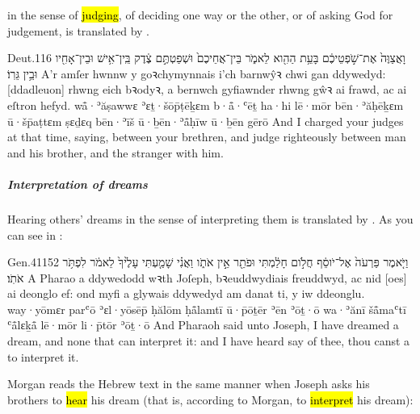 
\begin{paper}
	{\click}  in the sense of \hl{judging}, of deciding one way or the other, or of asking God for judgement, is translated by .
\end{paper}

\begin{example}{Deut.}{1}{16}{}{}
	\quoling
	{וָאֲצַוֶּה֙ אֶת־שֹׁ֣פְטֵיכֶ֔ם בָּעֵ֥ת הַהִ֖וא לֵאמֹ֑ר  בֵּין־אֲחֵיכֶם֙ וּשְׁפַטְתֶּ֣ם צֶ֔דֶק בֵּֽין־אִ֥ישׁ וּבֵין־אָחִ֖יו וּבֵ֥ין גֵּרֽוֹ׃}
	{A’r amſer hwnnw y goꝛchymynnais i’ch barnwŷꝛ chwi gan ddywedyd:  [ddadleuon] rhwng eich bꝛodyꝛ, a bernwch gyfiawnder rhwng gŵꝛ ai frawd, ac ai eſtron hefyd.}
	{wå̄·ʾăṣawwɛ ʾɛṯ·šōp̄ṭēḵɛm b·å̄·ʿēṯ ha·hi lē·mōr  bēn·ʾăḥēḵɛm ū·šp̄aṭtɛm ṣɛḏɛq bēn·ʾīš ū·ḇēn·ʾå̄ḥīw ū·ḇēn gērō}
	{And I charged your judges at that time, saying,   between your brethren, and judge righteously between  man and his brother, and the stranger  with him.}
\end{example}



\subparagraph{Interpretation of dreams}

\begin{paper}
	{\click} Hearing others’ dreams in the sense of interpreting them is translated by . As you can see in :
\end{paper}

\begin{example}{Gen.}{41}{15}{2}{}
	\quoling
	{וַיֹּ֤אמֶר פַּרְעֹה֙ אֶל־יֹוסֵ֔ף חֲלֹ֣ום חָלַ֔מְתִּי וּפֹתֵ֖ר אֵ֣ין אֹתֹ֑ו וַאֲנִ֗י שָׁמַ֤עְתִּי עָלֶ֙יךָ֙ לֵאמֹ֔ר   לִפְתֹּ֥ר אֹתֹֽו׃}
	{A Pharao a ddywedodd wꝛth Joſeph, bꝛeuddwydiais freuddwyd, ac nid [oes] ai deonglo ef: ond myfi a glywais ddywedyd am danat ti, y   iw ddeonglu.}
	{way·yōmɛr parʿō ʾɛl·yōsēp̄ ḥălōm ḥå̄lamtī ū·p̄ōṯēr ʾēn ʾōṯ·ō wa·ʾănī šå̄maʿtī ʿå̄lɛḵå̄ lē·mōr   li·p̄tōr ʾōṯ·ō}
	{And Pharaoh said unto Joseph, I have dreamed a dream, and  none that can interpret it: and I have heard say of thee,  thou canst  a  to interpret it.}
\end{example}

\begin{paper}
	{\click} Morgan reads the Hebrew text in the same manner when Joseph asks his brothers to \hl{hear} his dream (that is, according to Morgan, to \hl{interpret} his dream):
\end{paper}

